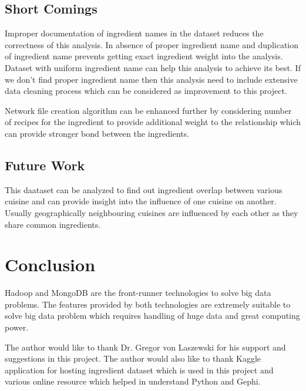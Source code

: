 \documentclass[sigconf]{acmart}
\begin{document}
\subsection{Short Comings}
Improper documentation of ingredient names in the dataset reduces the correctness of this analysis. In absence of proper ingredient name and duplication of ingredient name prevents getting exact ingredient weight into the analysis. Dataset with uniform ingredient name can help this analysis to achieve its best. If we don't find proper ingredient name then this analysis need to include extensive data cleaning process which can be considered as improvement to this project.

Network file creation algorithm can be enhanced further by considering number of recipes for the ingredient to provide additional weight to the relationship which can provide stronger bond between the ingredients. 

\subsection{Future Work}
This daataset can be analyzed to find out ingredient overlap between various cuisine and can provide insight into the influence of one cuisine on another. Usually geographically neighbouring cuisines are influenced by each other as they share common ingredients.

\section{Conclusion}
Hadoop and MongoDB are the front-runner technologies to solve big data problems. The features provided by both technologies are extremely suitable to solve big data problem which requires handling of huge data and great computing power.

\begin{acks}

  The author would like to thank Dr. Gregor von Laszewski for his
  support and suggestions in this project. The author would also like to thank Kaggle application for hosting ingredient dataset which is used in this project and various online resource which helped in understand Python and Gephi.  

\end{acks}


 

\appendix


\end{document}
